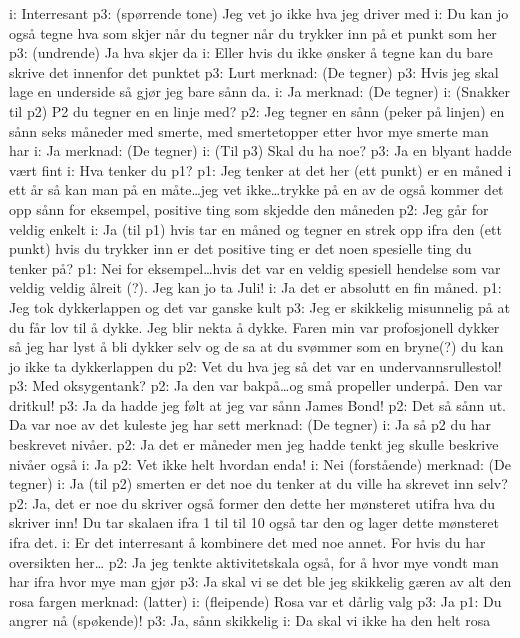 \documentclass[11pt,UKenglish, a4paper]{article}
\begin{document}
i: Interresant
p3: (spørrende tone) Jeg vet jo ikke hva jeg driver med
i: Du kan jo også tegne hva som skjer når du tegner når du trykker inn på et punkt som her
p3: (undrende) Ja hva skjer da
i: Eller hvis du ikke ønsker å tegne kan du bare skrive det innenfor det punktet
p3: Lurt
merknad: (De tegner)
p3: Hvis jeg skal lage en underside så gjør jeg bare sånn da. 
i: Ja
merknad: (De tegner)
i: (Snakker til p2) P2 du tegner en en linje med?
p2: Jeg tegner en sånn (peker på linjen) en sånn seks måneder med smerte, med smertetopper etter hvor mye smerte man har
i: Ja
merknad: (De tegner)
i: (Til p3) Skal du ha noe?
p3: Ja en blyant hadde vært fint
i: Hva tenker du p1?
p1: Jeg tenker at det her (ett punkt) er en måned i ett år så kan man på en måte\dots jeg vet ikke\dots trykke på en av de også kommer det opp sånn for eksempel, positive ting som skjedde den måneden
p2: Jeg går for veldig enkelt
i: Ja (til p1) hvis tar en måned og tegner en strek opp ifra den (ett punkt) hvis du trykker inn er det positive ting er det noen spesielle ting du tenker på?
p1: Nei for eksempel\dots hvis det var en veldig spesiell hendelse som var veldig veldig ålreit (?). Jeg kan jo ta Juli!
i: Ja det er absolutt en fin måned.
p1: Jeg tok dykkerlappen og det var ganske kult
p3: Jeg er skikkelig misunnelig på at du får lov til å dykke. Jeg blir nekta å dykke. Faren min var profosjonell dykker så jeg har lyst å bli dykker selv og de sa at du svømmer som en bryne(?) du kan jo ikke ta dykkerlappen du
p2: Vet du hva jeg så det var en undervannsrullestol! 
p3: Med oksygentank?
p2: Ja den var bakpå\dots og små propeller underpå. Den var dritkul!
p3: Ja da hadde jeg følt at jeg var sånn James Bond!
p2: Det så sånn ut. Da var noe av det kuleste jeg har sett
merknad: (De tegner)
i: Ja så p2 du har beskrevet nivåer.
p2: Ja det er måneder men jeg hadde tenkt jeg skulle beskrive nivåer også
i: Ja
p2: Vet ikke helt hvordan enda!
i: Nei (forstående)
merknad: (De tegner)
i: Ja (til p2) smerten er det noe du tenker at du ville ha skrevet inn selv?
p2: Ja, det er noe du skriver også former den dette her mønsteret utifra hva du skriver inn! Du tar skalaen ifra 1 til til 10 også tar den og lager dette mønsteret ifra det.
i: Er det interresant å kombinere det med noe annet. For hvis du har oversikten her\dots
p2: Ja jeg tenkte aktivitetskala også, for å hvor mye vondt man har ifra hvor mye man gjør
p3: Ja skal vi se det ble jeg skikkelig gæren av alt den rosa fargen
merknad: (latter)
i: (fleipende) Rosa var et dårlig valg
p3: Ja
p1: Du angrer nå (spøkende)!
p3: Ja, sånn skikkelig
i: Da skal vi ikke ha den helt rosa
\end{document}
